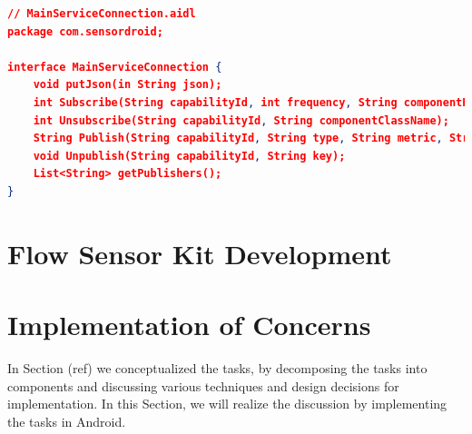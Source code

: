 \begin{lstlisting}[language=json, caption={My Caption}, captionpos=b]
// MainServiceConnection.aidl
package com.sensordroid;

interface MainServiceConnection {
    void putJson(in String json);
    int Subscribe(String capabilityId, int frequency, String componentPackageName, String componentClassName);
    int Unsubscribe(String capabilityId, String componentClassName);
    String Publish(String capabilityId, String type, String metric, String description);
    void Unpublish(String capabilityId, String key);
    List<String> getPublishers();
}
\end{lstlisting}



\section{Flow Sensor Kit Development}

\section{Implementation of Concerns}
In Section (ref) we conceptualized the tasks, by decomposing the tasks into components and discussing various techniques and design decisions for implementation. In this Section, we will realize the discussion by implementing the tasks in Android. 



